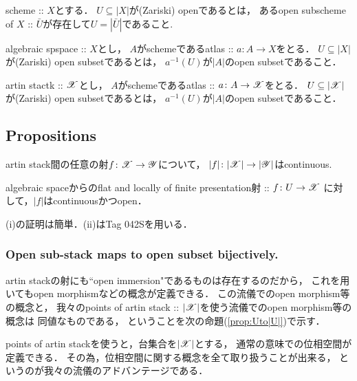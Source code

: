 \documentclass[a4paper, dvipdfmx]{jsarticle}
\begin{document}
\begin{Def}
\begin{myenum}
    \item
        scheme :: $X$とする．
        $U \subseteq |X|$が(Zariski) openであるとは，
        あるopen subscheme of $X$ :: $\bar{U}$が存在して$U=|\bar{U}|$であること.

    \item
        algebraic spspace :: $X$とし，
        $A$がschemeであるatlas :: $a \colon A \to X$をとる．
        $U \subseteq |X|$が(Zariski) open subsetであるとは，
        $a^{-1}(U)$が$|A|$のopen subsetであること．

    \item
        artin stactk :: $\mathscr{X}$とし，
        $A$がschemeであるatlas :: $a \colon A \to \mathscr{X}$をとる．
        $U \subseteq |\mathscr{X}|$が(Zariski) open subsetであるとは，
        $a^{-1}(U)$が$|A|$のopen subsetであること．
\end{myenum}
\end{Def}

\subsection{Propositions}

\begin{Prop}[\cite{SP} 04XL]
\begin{myenum}
    \item
        artin stack間の任意の射$f \colon \mathscr{X} \to \mathscr{Y}$について，
        $|f| \colon |\mathscr{X}| \to |\mathscr{Y}|$はcontinuous.
    \item
        algebraic spaceからのflat and locally of finite presentation射 :: $f \colon U \to \mathscr{X}$
        に対して，$|f|$はcontinuousかつopen．
\end{myenum}
\end{Prop}

(i)の証明は簡単．(ii)はTag  042Sを用いる．

\subsubsection{Open sub-stack maps to open subset bijectively.}
\begin{Remark}
    artin stackの射にも``open immersion"であるものは存在するのだから，
    これを用いてもopen morphismなどの概念が定義できる．
    この流儀でのopen morphism等の概念と，
    我々のpoints of artin stack :: $|\mathscr{X}|$を使う流儀でのopen morphism等の概念は
    同値なものである，
    ということを次の命題(\ref{prop:Uto|U|})で示す．

    points of artin stackを使うと，台集合を$|\mathscr{X}|$とする，
    通常の意味での位相空間が定義できる．
    その為，位相空間に関する概念を全て取り扱うことが出来る，
    というのが我々の流儀のアドバンテージである．
\end{Remark}
\end{document}
